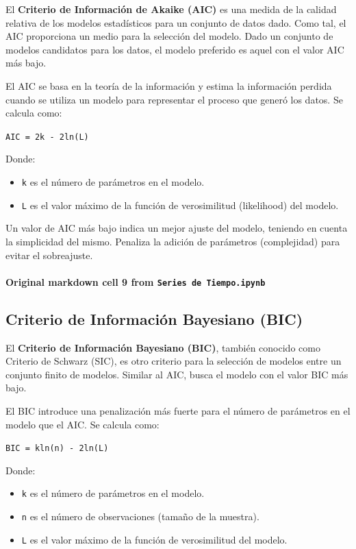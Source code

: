 \documentclass[
  11pt,
]{article}
\providecommand{\tightlist}{%
  \setlength{\itemsep}{0pt}\setlength{\parskip}{0pt}}
\begin{document}
El \textbf{Criterio de Información de Akaike (AIC)} es una medida de la calidad relativa de los modelos estadísticos para un conjunto de datos dado. Como tal, el AIC proporciona un medio para la selección del modelo. Dado un conjunto de modelos candidatos para los datos, el modelo preferido es aquel con el valor AIC más bajo.

El AIC se basa en la teoría de la información y estima la información perdida cuando se utiliza un modelo para representar el proceso que generó los datos. Se calcula como:

\texttt{AIC\ =\ 2k\ -\ 2ln(L)}

Donde:

\begin{itemize}
\tightlist
\item
  \texttt{k} es el número de parámetros en el modelo.
\item
  \texttt{L} es el valor máximo de la función de verosimilitud (likelihood) del modelo.
\end{itemize}

Un valor de AIC más bajo indica un mejor ajuste del modelo, teniendo en cuenta la simplicidad del mismo. Penaliza la adición de parámetros (complejidad) para evitar el sobreajuste.

\paragraph{\texorpdfstring{Original markdown cell 9 from \texttt{Series\ de\ Tiempo.ipynb}}{Original markdown cell 9 from Series de Tiempo.ipynb}}\label{original-markdown-cell-9-from-series-de-tiempoipynb}

\subsection{Criterio de Información Bayesiano (BIC)}\label{criterio-de-informaciuxf3n-bayesiano-bic}

El \textbf{Criterio de Información Bayesiano (BIC)}, también conocido como Criterio de Schwarz (SIC), es otro criterio para la selección de modelos entre un conjunto finito de modelos. Similar al AIC, busca el modelo con el valor BIC más bajo.

El BIC introduce una penalización más fuerte para el número de parámetros en el modelo que el AIC. Se calcula como:

\texttt{BIC\ =\ kln(n)\ -\ 2ln(L)}

Donde:

\begin{itemize}
\tightlist
\item
  \texttt{k} es el número de parámetros en el modelo.
\item
  \texttt{n} es el número de observaciones (tamaño de la muestra).
\item
  \texttt{L} es el valor máximo de la función de verosimilitud del modelo.
\end{itemize}
\end{document}

